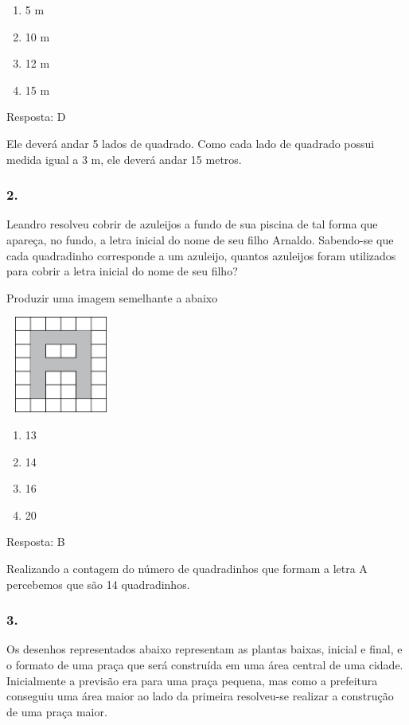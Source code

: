\begin{enumerate}
\def\labelenumi{\alph{enumi})}
\item
  5 m
\item
  10 m
\item
  12 m
\item
  15 m
\end{enumerate}

Resposta: D

Ele deverá andar 5 lados de quadrado. Como cada lado de quadrado possui
medida igual a 3 m, ele deverá andar 15 metros.

\subsubsection{2.}\label{section-78}

Leandro resolveu cobrir de azuleijos a fundo de sua piscina de tal forma
que apareça, no fundo, a letra inicial do nome de seu filho Arnaldo.
Sabendo-se que cada quadradinho corresponde a um azuleijo, quantos
azuleijos foram utilizados para cobrir a letra inicial do nome de seu
filho?

Produzir uma imagem semelhante a abaixo

\includegraphics[width=1.42949in,height=1.25160in]{media/image62.png}

\begin{enumerate}
\def\labelenumi{\alph{enumi})}
\item
  13
\item
  14
\item
  16
\item
  20
\end{enumerate}

Resposta: B

Realizando a contagem do número de quadradinhos que formam a letra A
percebemos que são 14 quadradinhos.

\subsubsection{3.}\label{section-79}

Os desenhos representados abaixo representam as plantas baixas, inicial
e final, e o formato de uma praça que será construída em uma área
central de uma cidade. Inicialmente a previsão era para uma praça
pequena, mas como a prefeitura conseguiu uma área maior ao lado da
primeira resolveu-se realizar a construção de uma praça maior.


